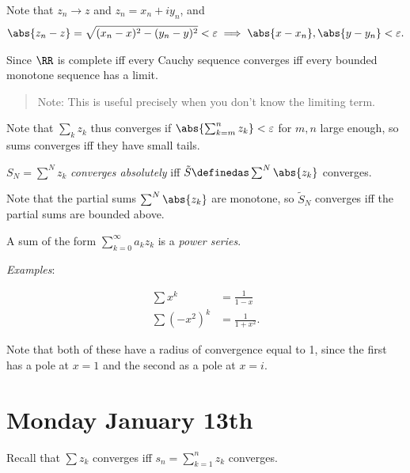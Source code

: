 Note that \(z_n \to z\) and \(z_n = x_n + iy_n\), and
\begin{align*}\abs{z_n - z} = \sqrt{(x_n - x)^2 - (y_n - y)^2} < \varepsilon \implies \abs{x - x_n}, \abs{y - y_n} < \varepsilon.\end{align*}

Since \(\RR\) is complete iff every Cauchy sequence converges iff every
bounded monotone sequence has a limit.

\begin{quote}
Note: This is useful precisely when you don't know the limiting term.
\end{quote}

Note that \(\sum_k z_k\) thus converges if
\(\abs{\sum_{k=m}^n z_k} < \varepsilon\) for \(m, n\) large enough, so
sums converges iff they have small tails.

\begin{description}
\tightlist
\item[Definition (Absolute Convergence)]
\(S_N = \sum^N z_k\) \emph{converges absolutely} iff
\(\tilde S \definedas \sum^N \abs{z_k}\) converges.
\end{description}

Note that the partial sums \(\sum^N \abs{z_k}\) are monotone, so
\(\tilde S_N\) converges iff the partial sums are bounded above.

\begin{description}
\tightlist
\item[Definition (Power Series)]
A sum of the form \(\sum_{k=0}^\infty a_k z_k\) is a \emph{power
series}.
\end{description}

\emph{Examples}:

\begin{align*}
\sum x^k &= \frac 1 {1-x} \\
\sum (-x^2)^k &= \frac 1 {1+x^2}
.\end{align*}

Note that both of these have a radius of convergence equal to 1, since
the first has a pole at \(x=1\) and the second as a pole at \(x = i\).

\hypertarget{monday-january-13th}{%
\section{Monday January 13th}\label{monday-january-13th}}

Recall that \(\sum z_k\) converges iff \(s_n = \sum_{k=1}^n z_k\)
converges.

